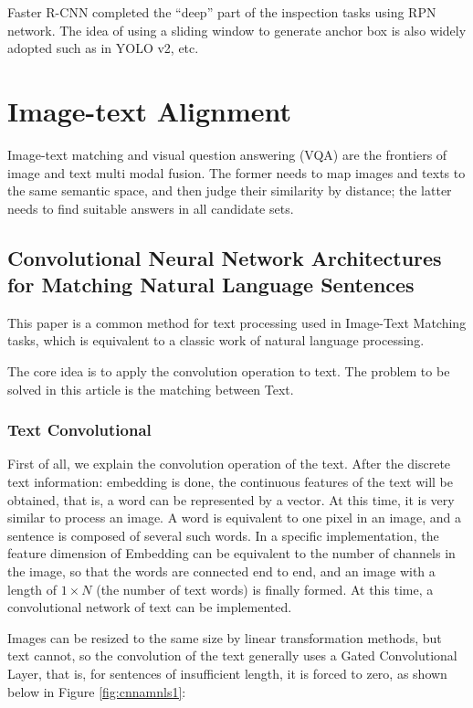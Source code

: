 Faster R-CNN completed the ``deep'' part of the inspection tasks using RPN network. The idea of using a sliding window to generate anchor box is also widely adopted such as in YOLO v2, etc. 


\section{Image-text Alignment}
Image-text matching and visual question answering (VQA) are the frontiers of image and text multi modal fusion. The former needs to map images and texts to the same semantic space, and then judge their similarity by distance; the latter needs to find suitable answers in all candidate sets.

\subsection{Convolutional Neural Network Architectures for Matching Natural Language Sentences}

This paper \cite{hu2015convolutional} is a common method for text processing used in Image-Text Matching tasks, which is equivalent to a classic work of natural language processing.

The core idea is to apply the convolution operation to text. The problem to be solved in this article is the matching between Text.

\subsubsection{Text Convolutional}
First of all, we explain the convolution operation of the text. After the discrete text information: embedding is done, the continuous features of the text will be obtained, that is, a word can be represented by a vector. At this time, it is very similar to process an image. A word is equivalent to one pixel in an image, and a sentence is composed of several such words. In a specific implementation, the feature dimension of Embedding can be equivalent to the number of channels in the image, so that the words are connected end to end, and an image with a length of $1\times N$ (the number of text words) is finally formed. At this time, a convolutional network of text can be implemented.

Images can be resized to the same size by linear transformation methods, but text cannot, so the convolution of the text generally uses a Gated Convolutional Layer, that is, for sentences of insufficient length, it is forced to zero, as shown below in Figure \ref{fig:cnnamnls1}:

